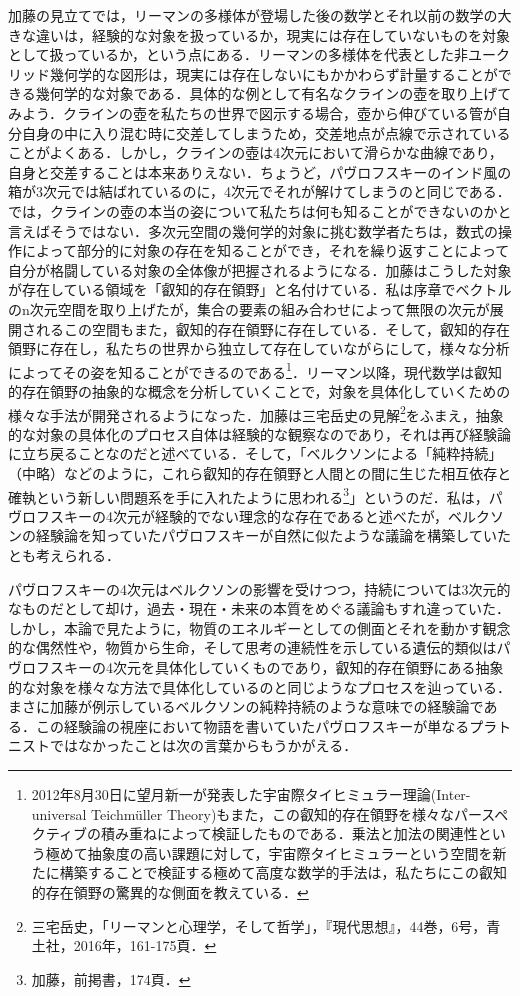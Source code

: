 加藤の見立てでは，リーマンの多様体が登場した後の数学とそれ以前の数学の大きな違いは，経験的な対象を扱っているか，現実には存在していないものを対象として扱っているか，という点にある．リーマンの多様体を代表とした非ユークリッド幾何学的な図形は，現実には存在しないにもかかわらず計量することができる幾何学的な対象である．具体的な例として有名なクラインの壺を取り上げてみよう．クラインの壺を私たちの世界で図示する場合，壺から伸びている管が自分自身の中に入り混む時に交差してしまうため，交差地点が点線で示されていることがよくある．しかし，クラインの壺は4次元において滑らかな曲線であり，自身と交差することは本来ありえない．ちょうど，パヴロフスキーのインド風の箱が3次元では結ばれているのに，4次元でそれが解けてしまうのと同じである．では，クラインの壺の本当の姿について私たちは何も知ることができないのかと言えばそうではない．多次元空間の幾何学的対象に挑む数学者たちは，数式の操作によって部分的に対象の存在を知ることができ，それを繰り返すことによって自分が格闘している対象の全体像が把握されるようになる．加藤はこうした対象が存在している領域を「叡知的存在領野」と名付けている．私は序章でベクトルのn次元空間を取り上げたが，集合の要素の組み合わせによって無限の次元が展開されるこの空間もまた，叡知的存在領野に存在している．そして，叡知的存在領野に存在し，私たちの世界から独立して存在していながらにして，様々な分析によってその姿を知ることができるのである\footnote{2012年8月30日に望月新一が発表した宇宙際タイヒミュラー理論(Inter-universal Teichmüller Theory)もまた，この叡知的存在領野を様々なパースペクティブの積み重ねによって検証したものである．乗法と加法の関連性という極めて抽象度の高い課題に対して，宇宙際タイヒミュラーという空間を新たに構築することで検証する極めて高度な数学的手法は，私たちにこの叡知的存在領野の驚異的な側面を教えている．}．リーマン以降，現代数学は叡知的存在領野の抽象的な概念を分析していくことで，対象を具体化していくための様々な手法が開発されるようになった．加藤は三宅岳史の見解\footnote{三宅岳史，「リーマンと心理学，そして哲学」，『現代思想』，44巻，6号，青土社，2016年，161-175頁．}をふまえ，抽象的な対象の具体化のプロセス自体は経験的な観察なのであり，それは再び経験論に立ち戻ることなのだと述べている．そして，「ベルクソンによる「純粋持続」（中略）などのように，これら叡知的存在領野と人間との間に生じた相互依存と確執という新しい問題系を手に入れたように思われる\footnote{加藤，前掲書，174頁．}」というのだ．私は，パヴロフスキーの4次元が経験的でない理念的な存在であると述べたが，ベルクソンの経験論を知っていたパヴロフスキーが自然に似たような議論を構築していたとも考えられる．

パヴロフスキーの4次元はベルクソンの影響を受けつつ，持続については3次元的なものだとして却け，過去・現在・未来の本質をめぐる議論もすれ違っていた．しかし，本論で見たように，物質のエネルギーとしての側面とそれを動かす観念的な偶然性や，物質から生命，そして思考の連続性を示している遺伝的類似はパヴロフスキーの4次元を具体化していくものであり，叡知的存在領野にある抽象的な対象を様々な方法で具体化しているのと同じようなプロセスを辿っている．まさに加藤が例示しているベルクソンの純粋持続のような意味での経験論である．この経験論の視座において物語を書いていたパヴロフスキーが単なるプラトニストではなかったことは次の言葉からもうかがえる．

